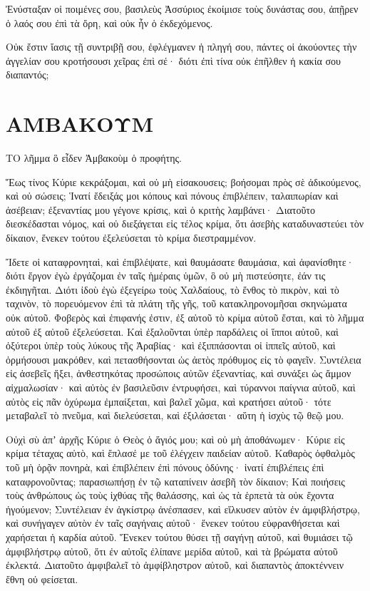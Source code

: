\begin{spacing}{1.1}
\begin{multicols}{2}
Ἐνύσταξαν οἱ ποιμένες σου, βασιλεὺς Ἀσσύριος ἐκοίμισε τοὺς δυνάστας σου, ἀπῇρεν ὁ λαός σου ἐπὶ τὰ ὄρη, καὶ οὐκ ἦν ὁ ἐκδεχόμενος.

Οὐκ ἔστιν ἴασις τῇ συντριβῇ σου, ἐφλέγμανεν ἡ πληγή σου, πάντες οἱ ἀκούοντες τὴν ἀγγελίαν σου κροτήσουσι χεῖρας ἐπὶ σέ· διότι ἐπὶ τίνα οὐκ ἐπῆλθεν ἡ κακία σου διαπαντός;


\end{multicols}
\chapter{ΑΜΒΑΚΟΥΜ}
\begin{multicols}{2}

ΤΟ λῆμμα ὃ εἶδεν Ἀμβακοὺμ ὁ προφήτης.

Ἕως τίνος Κύριε κεκράξομαι, καὶ οὐ μὴ εἰσακουσεις; βοήσομαι πρὸς σὲ ἀδικούμενος, καὶ οὐ σώσεις;
Ἱνατί ἔδειξάς μοι κόπους καὶ πόνους ἐπιβλέπειν, ταλαιπωρίαν καὶ ἀσέβειαν; ἐξεναντίας μου γέγονε κρίσις, καὶ ὁ κριτὴς λαμβάνει·
Διατοῦτο διεσκέδασται νόμος, καὶ οὐ διεξάγεται εἰς τέλος κρίμα, ὅτι ἀσεβὴς καταδυναστεύει τὸν δίκαιον, ἕνεκεν τούτου ἐξελεύσεται τὸ κρίμα διεστραμμένον.

Ἴδετε οἱ καταφρονηταὶ, καὶ ἐπιβλέψατε, καὶ θαυμάσατε θαυμάσια, καὶ ἀφανίσθητε· διότι ἔργον ἐγὼ ἐργάζομαι ἐν ταῖς ἡμέραις ὑμῶν, ὃ οὐ μὴ πιστεύσητε, ἐάν τις ἐκδιηγῆται.
Διότι ἰδοὺ ἐγὼ ἐξεγείρω τοὺς Χαλδαίους, τὸ ἔνθος τὸ πικρὸν, καὶ τὸ ταχινὸν, τὸ πορευόμενον ἐπὶ τὰ πλάτη τῆς γῆς, τοῦ κατακληρονομῆσαι σκηνώματα οὐκ αὐτοῦ.
Φοβερὸς καὶ ἐπιφανής ἐστιν, ἐξ αὐτοῦ τὸ κρίμα αὐτοῦ ἔσται, καὶ τὸ λῆμμα αὐτοῦ ἐξ αὐτοῦ ἐξελεύσεται.
Καὶ ἐξαλοῦνται ὑπὲρ παρδάλεις οἱ ἵπποι αὐτοῦ, καὶ ὀξύτεροι ὑπὲρ τοὺς λύκους τῆς Ἀραβίας· καὶ ἐξιππάσονται οἱ ἱππεῖς αὐτοῦ, καὶ ὁρμήσουσι μακρόθεν, καὶ πετασθήσονται ὡς ἀετὸς πρόθυμος εἰς τὸ φαγεῖν.
Συντέλεια εἰς ἀσεβεῖς ἥξει, ἀνθεστηκότας προσώποις αὐτῶν ἐξεναντίας, καὶ συνάξει ὡς ἄμμον αἰχμαλωσίαν·
καὶ αὐτὸς ἐν βασιλεῦσιν ἐντρυφήσει, καὶ τύραννοι παίγνια αὐτοῦ, καὶ αὐτὸς εἰς πᾶν ὀχύρωμα ἐμπαίξεται, καὶ βαλεῖ χῶμα, καὶ κρατήσει αὐτοῦ·
τότε μεταβαλεῖ τὸ πνεῦμα, καὶ διελεύσεται, καὶ ἐξιλάσεται· αὕτη ἡ ἰσχὺς τῷ θεῷ μου.

Οὐχὶ σὺ ἀπʼ ἀρχῆς Κύριε ὁ Θεὸς ὁ ἅγιός μου; καὶ οὐ μὴ ἀποθάνωμεν· Κύριε εἰς κρίμα τέταχας αὐτὸ, καὶ ἔπλασέ με τοῦ ἐλέγχειν παιδείαν αὐτοῦ.
Καθαρὸς ὀφθαλμὸς τοῦ μὴ ὁρᾷν πονηρὰ, καὶ ἐπιβλέπειν ἐπὶ πόνους ὀδύνης· ἱνατί ἐπιβλέπεις ἐπὶ καταφρονοῦντας; παρασιωπήσῃ ἐν τῷ καταπίνειν ἀσεβῆ τὸν δίκαιον;
Καὶ ποιήσεις τοὺς ἀνθρώπους ὡς τοὺς ἰχθύας τῆς θαλάσσης, καὶ ὡς τὰ ἑρπετὰ τὰ οὐκ ἔχοντα ἡγούμενον;
Συντέλειαν ἐν ἀγκίστρῳ ἀνέσπασεν, καὶ εἵλκυσεν αὐτὸν ἐν ἀμφιβλήστρῳ, καὶ συνήγαγεν αὐτὸν ἐν ταῖς σαγήναις αὐτοῦ· ἕνεκεν τούτου εὐφρανθήσεται καὶ χαρήσεται ἡ καρδία αὐτοῦ.
Ἕνεκεν τούτου θύσει τῇ σαγήνῃ αὐτοῦ, καὶ θυμιάσει τῷ ἀμφιβλήστρῳ αὐτοῦ, ὅτι ἐν αὐτοῖς ἐλίπανε μερίδα αὐτοῦ, καὶ τὰ βρώματα αὐτοῦ ἐκλεκτά.
Διατοῦτο ἀμφιβαλεῖ τὸ ἀμφίβληστρον αὐτοῦ, καὶ διαπαντὸς ἀποκτέννειν ἔθνη οὐ φείσεται.


\end{multicols}
\end{spacing}
